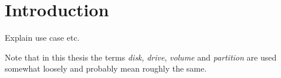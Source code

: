 \section{Introduction}
\label{chap:introduction}
Explain use case etc.

Note that in this thesis the terms \emph{disk}, \emph{drive}, \emph{volume} and \emph{partition} are used somewhat loosely and probably mean roughly the same.
